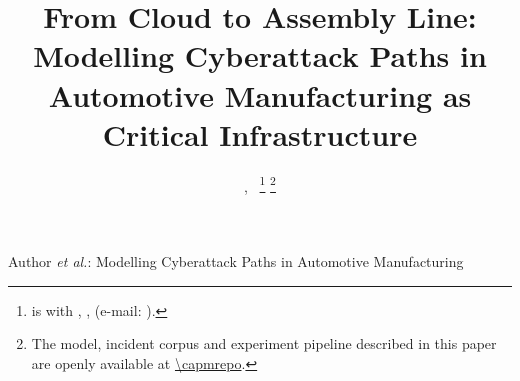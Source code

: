 \documentclass[journal]{IEEEtran}
\begin{document}
\title{From Cloud to Assembly Line: Modelling Cyberattack Paths in Automotive
Manufacturing as Critical Infrastructure}

\author{\capmauthor,~
\thanks{\capmauthor{} is with \capmaffiliation, \capmcity, \capmcountry
(e-mail: \capmemail).}
\thanks{The model, incident corpus and experiment pipeline described in this
paper are openly available at \url{\capmrepo}.}}

%
{Author \MakeLowercase{\textit{et al.}}: Modelling Cyberattack Paths in Automotive Manufacturing}

\maketitle

\begin{abstract}
\capmabstract
\end{abstract}

\begin{IEEEkeywords}
\capmkeywords
\end{IEEEkeywords}

\IEEEpeerreviewmaketitle






\end{document}
